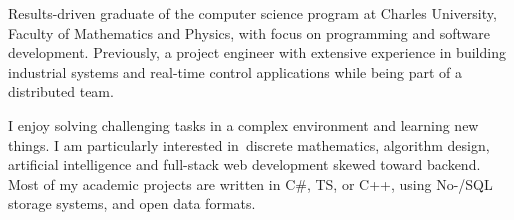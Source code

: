 Results-driven graduate of the computer science program at Charles University, Faculty of Mathematics and Physics, with focus on programming and software development. Previously, a project engineer with extensive experience in building industrial systems and real-time control applications while being part of a distributed team.

I enjoy solving challenging tasks in a complex environment and learning new things. I am particularly interested in~dis\-crete mathematics, algorithm design, artificial intelligence and full-stack web development skewed toward backend. Most of my academic projects are written in C\#, TS, or C++, using No-/SQL storage systems, and open data formats.
